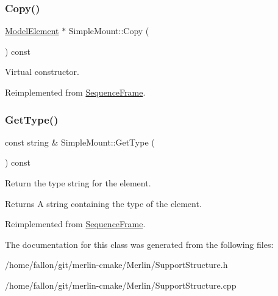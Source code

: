 \subsubsection{\texorpdfstring{Copy()}{Copy()}}
{\footnotesize\ttfamily \hyperlink{classModelElement}{Model\+Element} $\ast$ Simple\+Mount\+::\+Copy (\begin{DoxyParamCaption}{ }\end{DoxyParamCaption}) const\hspace{0.3cm}{\ttfamily [virtual]}}

Virtual constructor. 

Reimplemented from \hyperlink{classSequenceFrame_a89a9046c330fa9955cd2e6b67b5c64f7}{Sequence\+Frame}.

\mbox{\label{classSimpleMount_afc88ec17aa2aea7f526bb7f52913f96a}} 
\subsubsection{\texorpdfstring{Get\+Type()}{GetType()}}
{\footnotesize\ttfamily const string \& Simple\+Mount\+::\+Get\+Type (\begin{DoxyParamCaption}{ }\end{DoxyParamCaption}) const\hspace{0.3cm}{\ttfamily [virtual]}}

Return the type string for the element. \begin{DoxyReturn}{Returns}
A string containing the type of the element. 
\end{DoxyReturn}


Reimplemented from \hyperlink{classSequenceFrame_a062ab78de738251ac5af6c62b470edcf}{Sequence\+Frame}.



The documentation for this class was generated from the following files\+:\begin{DoxyCompactItemize}
\item 
/home/fallon/git/merlin-\/cmake/\+Merlin/Support\+Structure.\+h\item 
/home/fallon/git/merlin-\/cmake/\+Merlin/Support\+Structure.\+cpp\end{DoxyCompactItemize}
